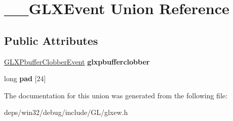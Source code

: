 \hypertarget{union_____g_l_x_event}{}\section{\+\_\+\+\_\+\+G\+L\+X\+Event Union Reference}
\label{union_____g_l_x_event}
\subsection*{Public Attributes}
\begin{DoxyCompactItemize}
\item 
\hypertarget{union_____g_l_x_event_ada5880e2b424bcb2f60a411aaf713fae}{}\hyperlink{struct_g_l_x_pbuffer_clobber_event}{G\+L\+X\+Pbuffer\+Clobber\+Event} {\bfseries glxpbufferclobber}\label{union_____g_l_x_event_ada5880e2b424bcb2f60a411aaf713fae}

\item 
\hypertarget{union_____g_l_x_event_a1cb8f6e7e77a34d25baf43b3f3bc2d4f}{}long {\bfseries pad} \mbox{[}24\mbox{]}\label{union_____g_l_x_event_a1cb8f6e7e77a34d25baf43b3f3bc2d4f}

\end{DoxyCompactItemize}


The documentation for this union was generated from the following file\+:\begin{DoxyCompactItemize}
\item 
deps/win32/debug/include/\+G\+L/glxew.\+h\end{DoxyCompactItemize}

